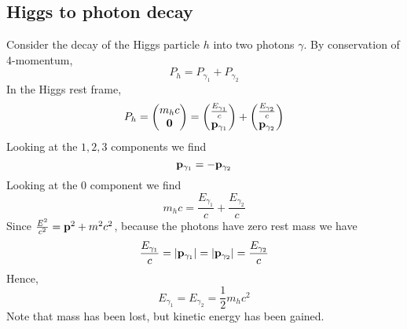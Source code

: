 \subsection{Higgs to photon decay}
Consider the decay of the Higgs particle \(h\) into two photons \(\gamma\).
By conservation of 4-momentum,
\[
	P_h = P_{\gamma_1} + P_{\gamma_2}
\]
In the Higgs rest frame,
\[
	P_h = \begin{pmatrix}
		m_h c \\ \vb 0
	\end{pmatrix} =
	\begin{pmatrix}
		\frac{E_{\gamma_1}}{c} \\ \vb p_{\gamma_1}
	\end{pmatrix}
	+
	\begin{pmatrix}
		\frac{E_{\gamma_2}}{c} \\ \vb p_{\gamma_2}
	\end{pmatrix}
\]
Looking at the \(1, 2, 3\) components we find
\[
	\vb p_{\gamma_1} = -\vb p_{\gamma_2}
\]
Looking at the 0 component we find
\[
	m_h c = \frac{E_{\gamma_1}}{c} + \frac{E_{\gamma_2}}{c}
\]
Since \(\frac{E^2}{c^2} = \vb p^2 + m^2c^2\), because the photons have zero rest mass we have
\[
	\frac{E_{\gamma_1}}{c} = \abs{\vb p_{\gamma_1}} = \abs{\vb p_{\gamma_2}} = \frac{E_{\gamma_2}}{c}
\]
Hence,
\[
	E_{\gamma_1} = E_{\gamma_2} = \frac{1}{2}m_h c^2
\]
Note that mass has been lost, but kinetic energy has been gained.

